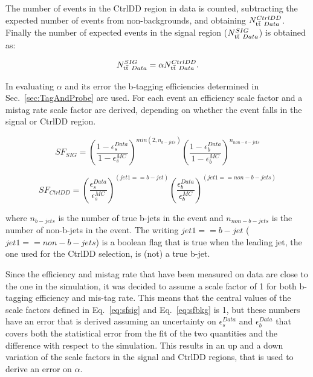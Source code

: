 The number of events in the CtrlDD region in data is counted, subtracting the expected number of events from non-\ttbar backgrounds, and obtaining $N_{\mathrm{t}\bar{\mathrm{t}}~Data}^{CtrlDD}$. Finally the number of expected \ttbar events in the signal region ($N_{\mathrm{t}\bar{\mathrm{t}}~Data}^{SIG}$) is obtained as:

\begin{equation}
N_{\mathrm{t}\bar{\mathrm{t}}~Data}^{SIG} = \alpha{}N_{\mathrm{t}\bar{\mathrm{t}}~Data}^{CtrlDD}.
\end{equation}

In evaluating $\alpha$ and its error the b-tagging efficiencies determined in Sec.~\ref{sec:TagAndProbe} are used. 
For each event an efficiency scale factor and a mistag rate scale factor are derived, depending on whether the event falls in the signal or CtrlDD region.

\begin{equation}
\label{eq:sfsig}
SF_{SIG} = \left(\frac{1-\epsilon_{s}^{Data}}{1-\epsilon_{s}^{MC}}\right)^{min(2, n_{b-jets})} \left(\frac{1-\epsilon_{b}^{Data}}{1-\epsilon_{b}^{MC}}\right)^{n_{non-b-jets}} 
\end{equation}

\begin{equation}
\label{eq:sfbkg}
SF_{CtrlDD} = \left(\frac{\epsilon_{s}^{Data}}{\epsilon_{s}^{MC}}\right)^{(jet1 == b-jet)} \left(\frac{\epsilon_{b}^{Data}}{\epsilon_{b}^{MC}}\right)^{(jet1 == non-b-jets)} 
\end{equation}

where $n_{b-jets}$ is the number of true b-jets in the event and $n_{non-b-jets}$ is the number of non-b-jets in the event. The writing $jet1 == b-jet$ ($jet1 == non-b-jets$) is a boolean flag that is true when the leading jet, the one used for the CtrlDD selection, is (not) a true b-jet.

Since the efficiency and mistag rate that have been measured on data are close to the one in the simulation, it was decided to assume a scale factor of 1 for both b-tagging efficiency and mis-tag rate. This means that the central values of the scale factors defined in Eq.~\ref{eq:sfsig} and Eq.~\ref{eq:sfbkg} is 1, but these numbers have an error that is derived assuming an uncertainty on $\epsilon_{s}^{Data}$ and $\epsilon_{b}^{Data}$ that covers both the statistical error from the fit of the two quantities and the difference with respect to the simulation.
This results in an up and a down variation of the scale factors in the signal and CtrlDD regions, that is used to derive an error on $\alpha$.

